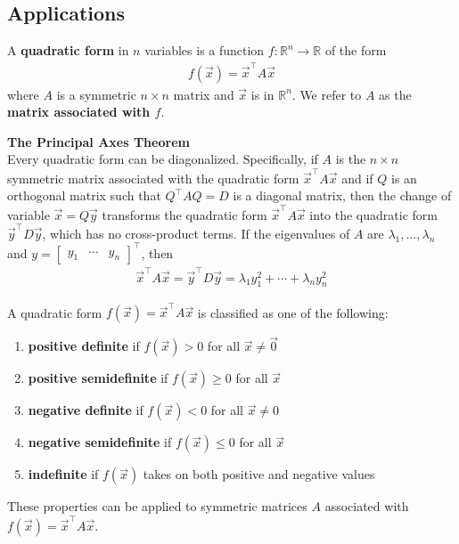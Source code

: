 \documentclass{article}
\begin{document}
\subsection{Applications}
\begin{definition}
	A \textbf{quadratic form} in $n$ variables is a function $f:\mathbb{R}^n\to\mathbb{R}$ of the form
	\begin{align*}
		f(\vec x) = \vec x^\intercal A\vec x
	\end{align*}
	where $A$ is a symmetric $n\times n$ matrix and $\vec x$ is in $\mathbb{R}^n$. We refer to $A$ as the \textbf{matrix associated with $f$}.
\end{definition}
\begin{theorem}
	\textbf{The Principal Axes Theorem}\\
	Every quadratic form can be diagonalized. Specifically, if $A$ is the $n\times n$ symmetric matrix associated with the quadratic form $\vec x^\intercal A\vec x$ and if $Q$ is an orthogonal matrix such that $Q^\intercal AQ=D$ is a diagonal matrix, then the change of variable $\vec x = Q\vec y$ transforms the quadratic form $\vec x^\intercal A\vec x$ into the quadratic form $\vec y^\intercal D\vec y$, which has no cross-product terms.
	If the eigenvalues of $A$ are $\lambda_1, ...,\lambda_n$ and $y=\begin{bmatrix}
			y_1 & \cdots & y_n
		\end{bmatrix}^\intercal $, then
	\begin{align*}
		\vec x^\intercal A\vec x = \vec y^\intercal D\vec y = \lambda_1 y_1^2+\cdots+\lambda_n y_n^2
	\end{align*}
\end{theorem}
\begin{definition}
	A quadratic form $f(\vec x) = \vec x^\intercal A\vec x$ is classified as one of the following:
	\begin{enumerate}
		\item \textbf{positive definite} if $f(\vec x)>0$ for all $\vec x \not= \vec 0$
		\item \textbf{positive semidefinite} if $f(\vec x)\geq 0$ for all $\vec x$
		\item \textbf{negative definite} if $f(\vec x)<0$ for all $\vec x \not= 0$
		\item \textbf{negative semidefinite} if $f(\vec x)\leq 0$ for all $\vec x$
		\item \textbf{indefinite} if $f(\vec x)$ takes on both positive and negative values
	\end{enumerate}
	These properties can be applied to symmetric matrices $A$ associated with $f(\vec x)=\vec x^\intercal A\vec x$.
\end{definition}
\end{document}
